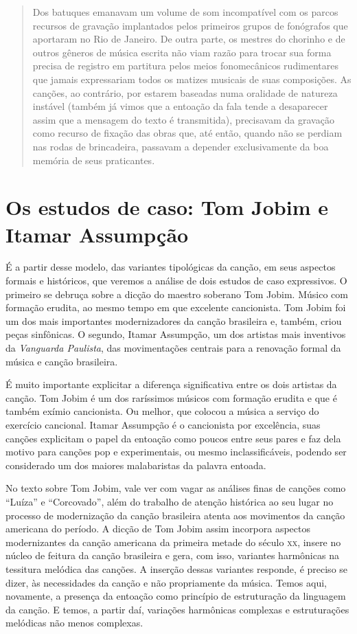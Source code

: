 \begin{quote}
Dos batuques emanavam um volume de som incompatível com os parcos
recursos de gravação implantados pelos primeiros grupos de fonógrafos
que aportaram no Rio de Janeiro. De outra parte, os mestres do chorinho
e de outros gêneros de música escrita não viam razão para trocar sua
forma precisa de registro em partitura pelos meios fonomecânicos
rudimentares que jamais expressariam todos os matizes musicais de suas
composições. As canções, ao contrário, por estarem baseadas numa
oralidade de natureza instável (também já vimos que a entoação da fala
tende a desaparecer assim que a mensagem do texto é transmitida),
precisavam da gravação como recurso de fixação das obras que, até então,
quando não se perdiam nas rodas de brincadeira, passavam a depender
exclusivamente da boa memória de seus praticantes.
\end{quote}

\section{Os estudos de caso: Tom Jobim e Itamar Assumpção}

É a partir desse modelo, das variantes tipológicas da canção, em seus
aspectos formais e históricos, que veremos a análise de dois estudos de
caso expressivos. O primeiro se debruça sobre a dicção do maestro
soberano Tom Jobim. Músico com formação erudita, ao mesmo tempo em que
excelente cancionista. Tom Jobim foi um dos mais importantes
modernizadores da canção brasileira e, também, criou peças sinfônicas. O
segundo, Itamar Assumpção, um dos artistas mais inventivos da
\emph{Vanguarda Paulista}, das movimentações centrais para a renovação
formal da música e canção brasileira.

É muito importante explicitar a diferença significativa entre os dois
artistas da canção. Tom Jobim é um dos raríssimos músicos com formação
erudita e que é também exímio cancionista. Ou melhor, que colocou a
música a serviço do exercício cancional. Itamar Assumpção é o
cancionista por excelência, suas canções explicitam o papel da entoação
como poucos entre seus pares e faz dela motivo para canções pop e
experimentais, ou mesmo inclassificáveis, podendo ser considerado um dos
maiores malabaristas da palavra entoada.

No texto sobre Tom Jobim, vale ver com vagar as análises finas de
canções como ``Luíza'' e ``Corcovado'', além do trabalho de atenção
histórica ao seu lugar no processo de modernização da canção brasileira
atenta aos movimentos da canção americana do período. A dicção de Tom
Jobim assim incorpora aspectos modernizantes da canção americana da
primeira metade do século \textsc{xx}, insere no núcleo de feitura da canção
brasileira e gera, com isso, variantes harmônicas na tessitura melódica
das canções. A inserção dessas variantes responde, é preciso se dizer,
às necessidades da canção e não propriamente da música. Temos aqui,
novamente, a presença da entoação como princípio de estruturação da
linguagem da canção. E temos, a partir daí, variações harmônicas
complexas e estruturações melódicas não menos complexas.

